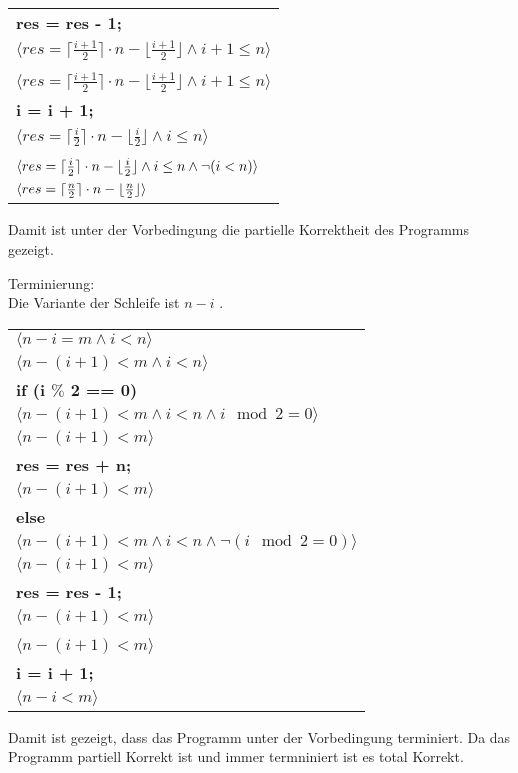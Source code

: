 \documentclass[12pt]{article}
\DeclarePairedDelimiter\ceil{\lceil}{\rceil}
\DeclarePairedDelimiter\floor{\lfloor}{\rfloor}
\begin{document}
\begin{center}
\begin{tabular}{l}
    \quad \quad \quad \quad \quad \textbf{res = res - 1;}\\
    \quad \quad \quad \quad$\langle res = \lceil \frac{i+1}{2}\rceil \cdot n - \lfloor\frac{i+1}{2} \rfloor \wedge i+1 \leq n \rangle$\\
    \quad \quad \quad \pmb{\}}\\
    \quad \quad$\langle res = \lceil \frac{i+1}{2}\rceil \cdot n - \lfloor\frac{i+1}{2} \rfloor \wedge i+1 \leq n \rangle$\\
    \quad \quad \quad \textbf{i = i + 1;}\\
    \quad \quad$\langle res = \lceil \frac{i}{2}\rceil \cdot n - \lfloor\frac{i}{2} \rfloor \wedge i \leq n\rangle$\\
    \quad \pmb{\}}\\
    $\langle res = \lceil \frac{i}{2}\rceil \cdot n - \floor{\frac{i}{2}} \wedge i \leq n \wedge \neg(i<n) \rangle$\\
    $\langle res = \ceil{\frac{n}{2}} \cdot n - \floor{\frac{n}{2}} \rangle$\\
\end{tabular}
\bigbreak
Damit ist unter der Vorbedingung die partielle Korrektheit des Programms gezeigt.
\pagebreak

    Terminierung:\\
    Die Variante der Schleife ist $n - i$ .
    \bigbreak
    \begin{tabular}{l}
        $\langle n-i=m \wedge i < n \rangle$\\
        $\langle n-(i+1)<m \wedge i < n \rangle$\\
        \quad \textbf{if (i $\%$ 2 == 0)} \pmb{\{} \\
        \quad \quad$\langle n-(i+1)<m \wedge i < n \wedge i \mod 2 = 0\rangle$\\
        \quad \quad $\langle n-(i+1)<m \rangle$\\
        \quad \quad \quad \textbf{res = res + n;}\\
        \quad \quad $\langle n-(i+1)<m \rangle$\\
        \quad \pmb{\}} \textbf{else} \pmb{\{} \\
        \quad \quad$\langle n-(i+1)<m \wedge i < n \wedge \neg(i \mod 2 = 0)\rangle$\\
        \quad \quad $\langle n-(i+1)<m \rangle$\\
        \quad \quad \quad \textbf{res = res - 1;}\\
        \quad \quad $\langle n-(i+1)<m \rangle$\\
        \quad \pmb{\}}\\
        $\langle n-(i+1)<m \rangle$\\
        \quad \textbf{i = i + 1;}\\
        $\langle n-i<m \rangle$
    \end{tabular}
    \bigbreak
    Damit ist gezeigt, dass das Programm unter der Vorbedingung terminiert.
    \bigbreak
    Da das Programm partiell Korrekt ist und immer termniniert ist es total Korrekt.
\end{center}
\end{document}
